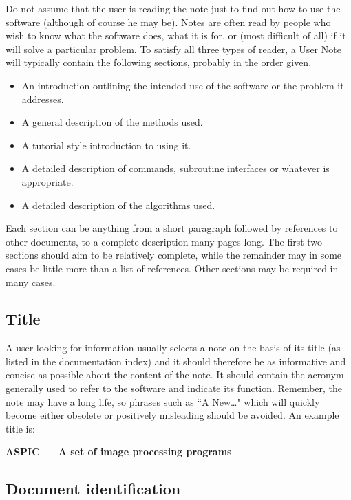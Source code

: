 Do not assume that the user is reading the note just to find out how to use the
software (although of course he may be).
Notes are often read by people who wish to know what the software does, what it
is for, or (most difficult of all) if it will solve a particular problem.
To satisfy all three types of reader, a User Note will typically contain the
following sections, probably in the order given.
\begin{itemize}
\item An introduction outlining the intended use of the software or the
problem it addresses.
\item A general description of the methods used.
\item A tutorial style introduction to using it.
\item A detailed description of commands, subroutine interfaces or whatever is
appropriate.
\item A detailed description of the algorithms used.
\end{itemize}
Each section can be anything from a short paragraph followed by references to
other documents, to a complete description many pages long.
The first two sections should aim to be relatively complete, while the remainder
may in some cases be little more than a list of references.
Other sections may be required in many cases.

\subsection{Title}

A user looking for information usually selects a note on the basis of its title
(as listed in the documentation index) and it should therefore be as informative
and concise as possible about the content of the note.
It should contain the acronym generally used to refer to the software and
indicate its function.
Remember, the note may have a long life, so phrases such as ``A New\ldots" which
will quickly become either obsolete or positively misleading should be avoided.
An example title is:

\begin{center}
{\bf ASPIC --- A set of image processing programs}
\end{center}

\subsection{Document identification}

